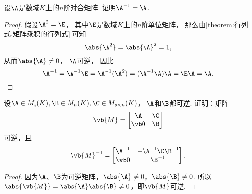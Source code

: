 \begin{example}\label{example:对合矩阵.对合矩阵的逆矩阵}
设\(\A\)是数域\(K\)上的\(n\)阶对合矩阵.
证明\(\A^{-1} = \A\).
\begin{proof}
假设\(\A^2=\E\)，
其中\(\E\)是数域\(K\)上的\(n\)阶单位矩阵，
那么由\cref{theorem:行列式.矩阵乘积的行列式} 可知\[
	\abs{\A^2}
	= \abs{\A}^2
	= 1,
\]
从而\(\abs{\A}\neq0\)，
\(\A\)可逆，
因此\[
	\A^{-1}
	= \A^{-1}\E
	= \A^{-1}(\A^2)
	= (\A^{-1}\A)\A
	= \E\A
	= \A.
	\qedhere
\]
\end{proof}
\end{example}

\begin{example}\label{example:可逆矩阵.分块上三角矩阵的逆}
设\(\A \in M_s(K),
\B \in M_n(K),
\C \in M_{s \times n}(K)\)，
\(\A\)和\(\B\)都可逆.
证明：矩阵\[
	\vb{M} = \begin{bmatrix}
		\A & \C \\
		\vb0 & \B
	\end{bmatrix}
\]可逆，且\[
	\vb{M}^{-1} = \begin{bmatrix}
		\A^{-1} & -\A^{-1} \C \B^{-1} \\
		\vb0 & \B^{-1}
	\end{bmatrix}.
\]
\begin{proof}
因为\(\A\)、\(\B\)为可逆矩阵，\(\abs{\A} \neq 0\)，\(\abs{\B} \neq 0\).
所以\(\abs{\vb{M}}=\abs{\A}\abs{\B} \neq 0\)，即\(\vb{M}\)可逆.


\end{proof}
\end{example}
